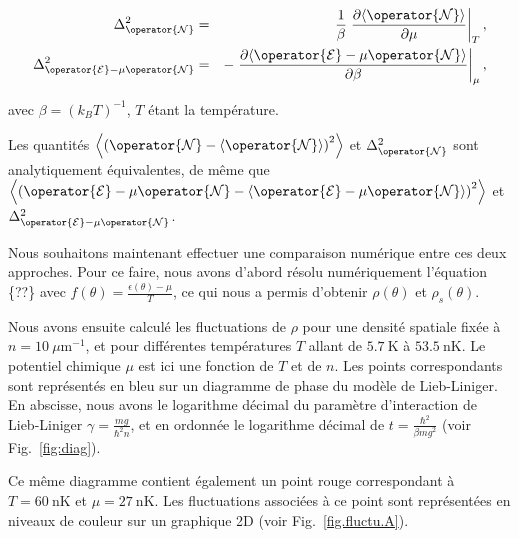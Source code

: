 \begin{eqnarray*}
    \Delta_{\operator{\mathcal{N}}}^2 &=& \frac{1}{\beta} \left. \frac{\partial \langle \operator{\mathcal{N}} \rangle}{\partial \mu} \right|_T, \\
    \Delta_{\operator{\mathcal{E}} - \mu \operator{\mathcal{N}}}^2 &=& - \left. \frac{\partial \langle \operator{\mathcal{E}} - \mu \operator{\mathcal{N}} \rangle}{\partial \beta} \right|_\mu,
\end{eqnarray*}

avec \( \beta = (k_B T)^{-1} \), \( T \) étant la température.

Les quantités \( \left \langle \left( \operator{\mathcal{N}} - \langle \operator{\mathcal{N}} \rangle \right)^2 \right \rangle \) et \( \Delta_{\operator{\mathcal{N}}}^2 \) sont analytiquement équivalentes, de même que \( \left \langle \left( \operator{\mathcal{E}} - \mu \operator{\mathcal{N}} - \langle \operator{\mathcal{E}} - \mu \operator{\mathcal{N}} \rangle \right)^2 \right \rangle \) et \( \Delta_{\operator{\mathcal{E}} - \mu \operator{\mathcal{N}}}^2 \).

Nous souhaitons maintenant effectuer une comparaison numérique entre ces deux approches. Pour ce faire, nous avons d'abord résolu numériquement l’équation \{??\} avec \( f(\theta) = \frac{\epsilon(\theta) - \mu}{T} \), ce qui nous a permis d’obtenir \( \rho(\theta) \) et \( \rho_s(\theta) \).

Nous avons ensuite calculé les fluctuations de \( \rho \) pour une densité spatiale fixée à \( n = 10~\mu \mathrm{m}^{-1} \), et pour différentes températures \( T \) allant de \( 5.7~\mathrm{K} \) à \( 53.5~\mathrm{nK} \). Le potentiel chimique \( \mu \) est ici une fonction de \( T \) et de \( n \). Les points correspondants sont représentés en bleu sur un diagramme de phase du modèle de Lieb-Liniger. En abscisse, nous avons le logarithme décimal du paramètre d’interaction de Lieb-Liniger \( \gamma = \frac{m g}{\hbar^2 n} \), et en ordonnée le logarithme décimal de \( t = \frac{\hbar^2}{\beta m g^2} \) (voir Fig.~\ref{fig:diag}).

Ce même diagramme contient également un point rouge correspondant à \( T = 60~\mathrm{nK} \) et \( \mu = 27~\mathrm{nK} \). Les fluctuations associées à ce point sont représentées en niveaux de couleur sur un graphique 2D (voir Fig.~\ref{fig.fluctu.A}).

